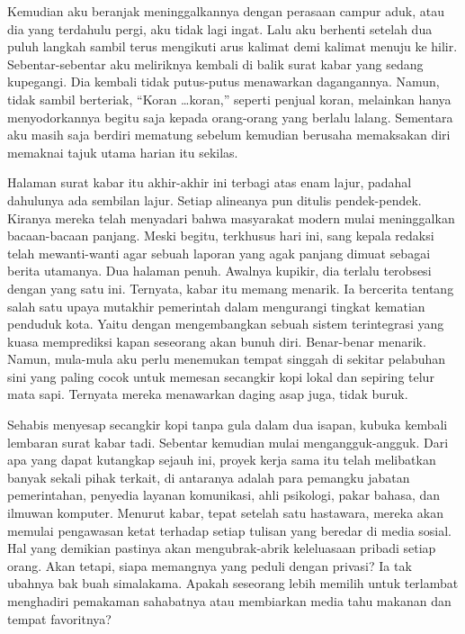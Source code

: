 \documentclass[smalldemyvopaper,11pt,twoside,onecolumn,openright,extrafontsizes]{memoir}
\begin{document}

Kemudian aku beranjak meninggalkannya dengan perasaan campur aduk, atau dia yang terdahulu pergi, aku tidak lagi ingat. Lalu aku berhenti setelah dua puluh langkah sambil terus mengikuti arus kalimat demi kalimat menuju ke hilir. Sebentar-sebentar aku meliriknya kembali di balik surat kabar yang sedang kupegangi. Dia kembali tidak putus-putus menawarkan dagangannya. Namun, tidak sambil berteriak, ``Koran \dots koran,'' seperti penjual koran, melainkan hanya menyodorkannya begitu saja kepada orang-orang yang berlalu lalang. Sementara aku masih saja berdiri mematung sebelum kemudian berusaha memaksakan diri memaknai tajuk utama harian itu sekilas.


Halaman surat kabar itu akhir-akhir ini terbagi atas enam lajur, padahal dahulunya ada sembilan lajur. Setiap alineanya pun ditulis pendek-pendek. Kiranya mereka telah menyadari bahwa masyarakat modern mulai meninggalkan bacaan-bacaan panjang. Meski begitu, terkhusus hari ini, sang kepala redaksi telah mewanti-wanti agar sebuah laporan yang agak panjang dimuat sebagai berita utamanya. Dua halaman penuh. Awalnya kupikir, dia terlalu terobsesi dengan yang satu ini. Ternyata, kabar itu memang menarik. Ia bercerita tentang salah satu upaya mutakhir pemerintah dalam mengurangi tingkat kematian penduduk kota. Yaitu dengan mengembangkan sebuah sistem terintegrasi yang kuasa memprediksi kapan seseorang akan bunuh diri. Benar-benar menarik. Namun, mula-mula aku perlu menemukan tempat singgah di sekitar pelabuhan sini yang paling cocok untuk memesan secangkir kopi lokal dan sepiring telur mata sapi. Ternyata mereka menawarkan daging asap juga, tidak buruk.


Sehabis menyesap secangkir kopi tanpa gula dalam dua isapan, kubuka kembali lembaran surat kabar tadi. Sebentar kemudian mulai mengangguk-angguk. Dari apa yang dapat kutangkap sejauh ini, proyek kerja sama itu telah melibatkan banyak sekali pihak terkait, di antaranya adalah para pemangku jabatan pemerintahan, penyedia layanan komunikasi, ahli psikologi, pakar bahasa, dan ilmuwan komputer. Menurut kabar, tepat setelah satu hastawara, mereka akan memulai pengawasan ketat terhadap setiap tulisan yang beredar di media sosial. Hal yang demikian pastinya akan mengubrak-abrik keleluasaan pribadi setiap orang. Akan tetapi, siapa memangnya yang peduli dengan privasi? Ia tak ubahnya bak buah simalakama. Apakah seseorang lebih memilih untuk terlambat menghadiri pemakaman sahabatnya atau membiarkan media tahu makanan dan tempat favoritnya?
\end{document}

